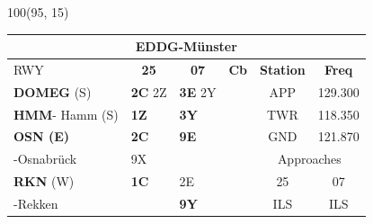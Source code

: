 \documentclass[10pt,landscape,a4paper]{article}
\begin{document}
\begin{textblock}{100}(95, 15)
\begin{table}[]
\begin{tabular}{|llllll}
\multicolumn{6}{c}{\textbf{EDDG-Münster}} \\ \hline
\multicolumn{1}{|l|}{RWY} 									& \multicolumn{1}{c|}{\textbf{25}} 				& \multicolumn{1}{c|}{\textbf{07}}  				& \multicolumn{1}{c|}{\textbf{Cb}} 						& \multicolumn{1}{c|}{\textbf{Station}} 	& \multicolumn{1}{c|}{\textbf{Freq}}\\ \hline
\multicolumn{1}{|l|}{\textbf{DOMEG} (S)}							& \multicolumn{1}{l|}{\textbf{2C} 2Z}				& \multicolumn{1}{l|}{\textbf{3E} 2Y} 				& \multicolumn{1}{c|}{\multirow{6}{*}{\rotatebox{90}{5000ft}}}		& \multicolumn{1}{c|}{APP}		& \multicolumn{1}{c|}{129.300}\\
\multicolumn{1}{|l|}{\textbf{HMM}- Hamm (S)}						& \multicolumn{1}{l|}{\textbf{1Z}}				& \multicolumn{1}{l|}{\textbf{3Y}}				& \multicolumn{1}{c|}{}  								& \multicolumn{1}{c|}{TWR}		& \multicolumn{1}{c|}{118.350} \\ \cline{1-3}

\multicolumn{1}{|l|}{\textbf{OSN (E)}} 								& \multicolumn{1}{l|}{\textbf{2C} } 				& \multicolumn{1}{l|}{\textbf{9E}}				& \multicolumn{1}{c|}{} 								& \multicolumn{1}{c|}{GND} 		& \multicolumn{1}{c|}{121.870} \\ \cline{5-6}
\multicolumn{1}{|l|}{-Osnabrück}								& \multicolumn{1}{l|}{9X}						& \multicolumn{1}{l|}{}						& \multicolumn{1}{c|}{} 								& \multicolumn{2}{c|}{Approaches}							\\ \cline{1-3} \cline{5-6}

\multicolumn{1}{|l|}{\textbf{RKN} (W)} 							& \multicolumn{1}{l|}{\textbf{1C}}				& \multicolumn{1}{l|}{2E}						& \multicolumn{1}{c|}{}								& \multicolumn{1}{c|}{25}& \multicolumn{1}{c|}{07} 				\\
\multicolumn{1}{|l|}{-Rekken} 									& \multicolumn{1}{l|}{\textbf{}} 					& \multicolumn{1}{l|}{\textbf{9Y}}				& \multicolumn{1}{c|}{}  								& \multicolumn{1}{c|}{ILS}& \multicolumn{1}{c|}{ILS}\\ \hline
\end{tabular}
\end{table}
\end{textblock}
\end{document}
